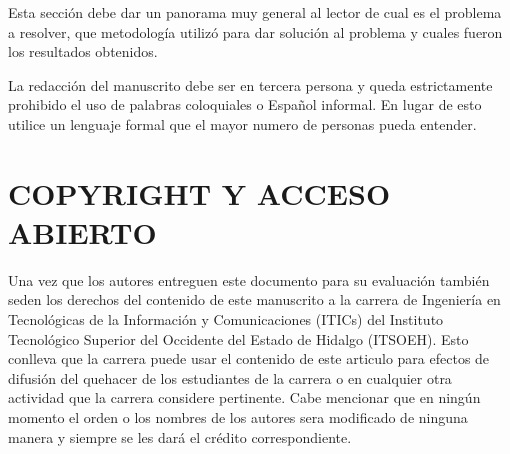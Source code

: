 \documentclass{IEEEcsmag}
\begin{document}
Esta sección debe dar un panorama muy general al lector de cual es el problema a resolver, que metodología utilizó para dar solución al problema y cuales fueron los resultados obtenidos. 

La redacción del manuscrito debe ser en tercera persona y queda estrictamente prohibido el uso de palabras coloquiales o Español informal. En lugar de esto utilice un lenguaje formal que el mayor numero de personas pueda entender.

\section{COPYRIGHT Y ACCESO ABIERTO}

Una vez que los autores entreguen este documento para su evaluación también seden los derechos del contenido de este manuscrito a la carrera de Ingeniería en Tecnológicas de la Información y Comunicaciones (ITICs) del Instituto Tecnológico Superior del Occidente del Estado de Hidalgo (ITSOEH). Esto conlleva que la carrera puede usar el contenido de este articulo para efectos de difusión del quehacer de los estudiantes de la carrera o en cualquier otra actividad que la carrera considere pertinente. Cabe mencionar que en ningún momento el orden o los nombres de los autores sera modificado de ninguna manera y siempre se les dará el crédito correspondiente. 
\end{document}
